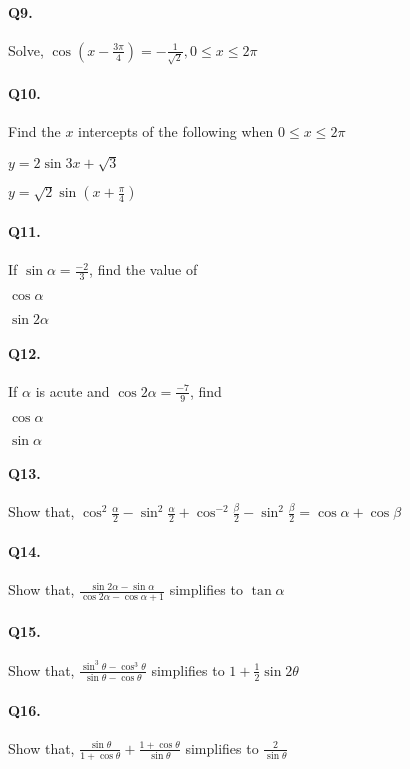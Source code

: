 \documentclass{article}
\begin{document}
\paragraph{Q9.}
Solve, $\cos \left( x - \frac{3\pi}{4} \right)= -\frac{1}{\sqrt{2}}, 0 \leq x \leq 2\pi$

\paragraph{Q10.}
Find the $x$ intercepts of the following when $0 \leq x \leq 2\pi$ 

\begin{enumerate*}[label=(\alph*)]
  \item $y = 2\sin 3x + \sqrt{3}$
  \item $y = \sqrt{2}\sin \left( x + \frac{\pi}{4} \right)$
\end{enumerate*}

\paragraph{Q11.}
If $\sin \alpha = \frac{-2}{3}$, find the value of

\begin{enumerate*}[label=(\alph*)]
  \item $\cos \alpha$
  \item $\sin 2\alpha$
\end{enumerate*}

\paragraph{Q12.}
If $\alpha$ is acute and $\cos 2\alpha = \frac{-7}{9}$, find

\begin{enumerate*}[label=(\alph*)]
  \item $\cos \alpha$
  \item $\sin \alpha$
\end{enumerate*}

\paragraph{Q13.}
Show that, $\cos^{2}\frac{\alpha}{2} - \sin^{2}\frac{\alpha}{2} + \cos^{-2}\frac{\beta}{2} - \sin^{2}\frac{\beta}{2} = \cos \alpha + \cos \beta$

\paragraph{Q14.}
Show that, $\frac{\sin 2\alpha - \sin\alpha}{\cos 2\alpha - \cos \alpha + 1}$ simplifies to $\tan \alpha$

\paragraph{Q15.}
Show that, $\frac{\sin^{3}\theta - \cos^{3}\theta}{\sin\theta - \cos\theta}$ simplifies to $1 + \frac{1}{2} \sin 2\theta$

\paragraph{Q16.}
Show that, $\frac{\sin\theta}{1 + \cos\theta} + \frac{1+\cos\theta}{\sin\theta}$ simplifies to $\frac{2}{\sin\theta}$
\end{document}
